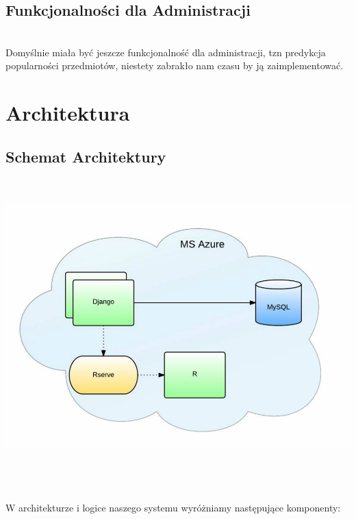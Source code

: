 \documentclass[licencjacka]{pracamgr}
\begin{document}
\section{Funkcjonalności dla Administracji}
~\\ \indent
Domyślnie miała być jeszcze funkcjonalność dla administracji, tzn predykcja popularności przedmiotów, niestety zabrakło nam czasu by ją zaimplementować.
 

 \chapter{Architektura} 
\section{Schemat Architektury}
~\\
\begin{minipage}{\linewidth} 
	\centering
           \includegraphics[scale = 0.5]{architekturaFin.jpg}
\end{minipage} \\ \\ \\
 W architekturze i logice naszego systemu wyróżniamy następujące komponenty:
\end{document}
